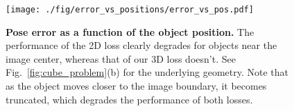 
\begin{figure}[t]
\centering
\texttt{[image: ./fig/error\_vs\_positions/error\_vs\_pos.pdf]}
\vspace{-3mm}
\caption{\small {\bf Pose error as a function of the object position.} The performance of the 2D loss clearly degrades for objects near the image center, whereas that of our 3D loss doesn't. See Fig.~\ref{fig:cube_problem}(b) for the underlying geometry. Note that as the object moves closer to the image boundary, it becomes truncated, which degrades the performance of both losses.}
\label{fig:error_vs_positions}
\end{figure}